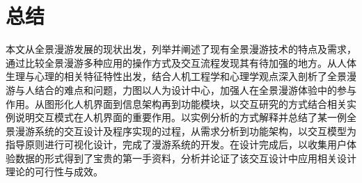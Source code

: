 \chapter{总结}
本文从全景漫游发展的现状出发，列举并阐述了现有全景漫游技术的特点及需求，通过比较全景漫游多种应用的操作方式及交互流程发现其有待加强的地方。从人体生理与心理的相关特征特性出发，结合人机工程学和心理学观点深入剖析了全景漫游与人结合的难点和问题，力图以人为设计中心，加强人在全景漫游体验中的参与作用。从图形化人机界面到信息架构再到功能模块，以交互研究的方式结合相关实例说明交互模式在人机界面的重要作用。以实例分析的方式解释并总结了某一例全景漫游系统的交互设计及程序实现的过程，从需求分析到功能架构，以交互模型为指导原则进行可视化设计，完成了漫游系统的开发。在设计完成后，以收集用户体验数据的形式得到了宝贵的第一手资料，分析并论证了该交互设计中应用相关设计理论的可行性与成效。